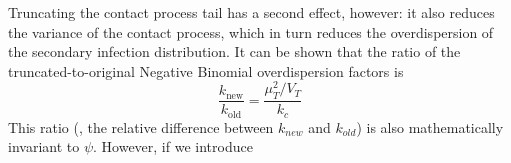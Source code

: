 Truncating the contact process tail has a second effect, however: it also reduces the variance of the contact process, which in turn reduces the overdispersion of the secondary infection distribution. It can be shown that the ratio of the truncated-to-original Negative Binomial overdispersion factors is 
\begin{equation}
	\frac{k_{\text{new}}}{k_{\text{old}}} = \frac{\mu_T^2/V_T}{k_c}
\end{equation}
This ratio (\ie, the relative difference between $k_{new}$ and $k_{old}$) is also mathematically invariant to $\psi$. However, if we introduce 








